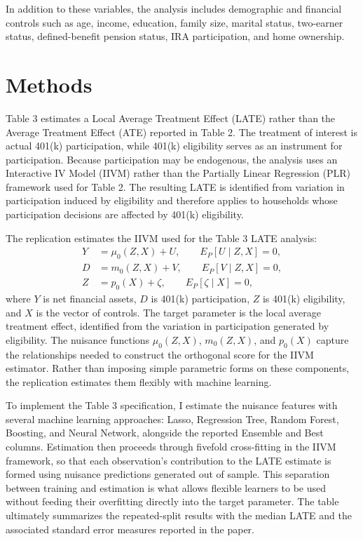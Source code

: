 \documentclass[12pt]{article}
\begin{document}
In addition to these variables, the analysis includes demographic and financial controls such as age, income, education, family size, marital status, two-earner status, defined-benefit pension status, IRA participation, and home ownership.

\section{Methods}

Table 3 estimates a Local Average Treatment Effect (LATE) rather than the Average Treatment Effect (ATE) reported in Table 2. The treatment of interest is actual 401(k) participation, while 401(k) eligibility serves as an instrument for participation. Because participation may be endogenous, the analysis uses an Interactive IV Model (IIVM) rather than the Partially Linear Regression (PLR) framework used for Table 2. The resulting LATE is identified from variation in participation induced by eligibility and therefore applies to households whose participation decisions are affected by 401(k) eligibility.

The replication estimates the IIVM used for the Table 3 LATE analysis:
\begin{align}
    Y &= \mu_0(Z, X) + U, \qquad E_P[U \mid Z, X] = 0, \\
    D &= m_0(Z, X) + V, \qquad E_P[V \mid Z, X] = 0, \\
    Z &= p_0(X) + \zeta, \qquad E_P[\zeta \mid X] = 0,
\end{align}
where $Y$ is net financial assets, $D$ is 401(k) participation, $Z$ is 401(k) eligibility, and $X$ is the vector of controls. The target parameter is the local average treatment effect, identified from the variation in participation generated by eligibility. The nuisance functions $\mu_0(Z, X)$, $m_0(Z, X)$, and $p_0(X)$ capture the relationships needed to construct the orthogonal score for the IIVM estimator. Rather than imposing simple parametric forms on these components, the replication estimates them flexibly with machine learning.

To implement the Table 3 specification, I estimate the nuisance features with several machine learning approaches: Lasso, Regression Tree, Random Forest, Boosting, and Neural Network, alongside the reported Ensemble and Best columns. Estimation then proceeds through fivefold cross-fitting in the IIVM framework, so that each observation's contribution to the LATE estimate is formed using nuisance predictions generated out of sample. This separation between training and estimation is what allows flexible learners to be used without feeding their overfitting directly into the target parameter. The table ultimately summarizes the repeated-split results with the median LATE and the associated standard error measures reported in the paper.
\end{document}
